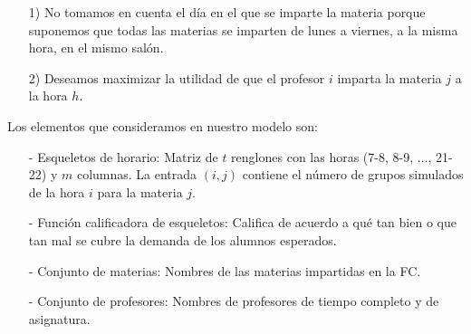   \begin{enumerate}
\item[1)] No tomamos en cuenta el día en el que se imparte la materia porque suponemos que todas las materias se imparten de lunes a viernes, a la misma hora, en el mismo salón.

\item[2)] Deseamos maximizar la utilidad de que el profesor $i$ imparta la materia $j$ a la hora $h$.
\end{enumerate}

  
  Los elementos que consideramos en nuestro modelo son:
  
  \begin{itemize}
\item[-] Esqueletos de horario: Matriz de $t$ renglones con las horas (7-8, 8-9, $\ldots$, 21-22) y $m$ columnas. La entrada $(i,j)$ contiene el número de grupos simulados de la hora $i$ para la materia $j$.

\item[-] Función calificadora de esqueletos: Califica de acuerdo a qué tan bien o que tan mal se cubre la demanda de los alumnos esperados.

\item[-] Conjunto de materias: Nombres de las materias impartidas en la FC.

\item[-] Conjunto de profesores: Nombres de profesores de tiempo completo y de asignatura.
\end{itemize}

